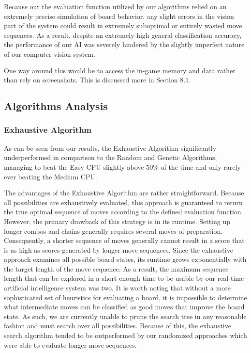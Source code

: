 \documentclass[12pt]{IEEEtran}
\begin{document}
Because our the evaluation function utilized by our algorithms relied on an extremely precise simulation of board behavior, any slight errors in the vision part of the system could result in extremely suboptimal or entirely wasted move sequences. As a result, despite an extremely high general classification accuracy, the performance of our AI was severely hindered by the slightly imperfect nature of our computer vision system.

One way around this would be to access the in-game memory and data rather than rely on screenshots. This is discussed more in Section $8.1$.

\subsection{Algorithms Analysis}

\subsubsection{Exhaustive Algorithm}

As can be seen from our results, the Exhaustive Algorithm significantly underperformed in comparison to the Random and Genetic Algorithms, managing to beat the Easy CPU slightly above 50\% of the time and only rarely ever beating the Medium CPU.

The advantages of the Exhaustive Algorithm are rather straightforward. Because all possibilities are exhaustively evaluated, this approach is guaranteed to return the true optimal sequence of moves according to the defined evaluation function. However, the primary drawback of this strategy is in its runtime. Setting up longer combos and chains generally requires several moves of preparation. Consequently, a shorter sequence of moves generally cannot result in a score that is as high as scores generated by longer move sequences. Since the exhaustive approach examines all possible board states, its runtime grows exponentially with the target length of the move sequence. As a result, the maximum sequence length that can be explored in a short enough time to be usable by our real-time artificial intelligence system was two. It is worth noting that without a more sophisticated set of heuristics for evaluating a board, it is impossible to determine what intermediate moves can be classified as good moves that improve the board state. As such, we are currently unable to prune the search tree in any reasonable fashion and must search over all possibilities. Because of this, the exhaustive search algorithm tended to be outperformed by our randomized approaches which were able to evaluate longer move sequences.
\end{document}
